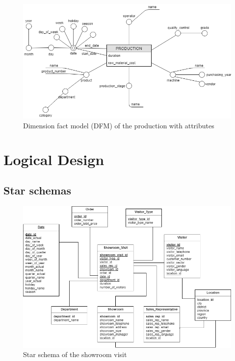 \documentclass[letterpaper,12pt]{article}
\begin{document}
\begin{figure}[h] 
        \centering
        \includegraphics[width=\columnwidth]{../images/DFM_Production.png}
        \caption{
                \label{fig:productionAttributes}  
                Dimension fact model (DFM) of the production with attributes 
        }
\end{figure}

\section{Logical Design}

\subsection{Star schemas}

\begin{figure}[h] 
        \centering
        \includegraphics[width=\columnwidth]{../images/Starschema_Showroom_visit.png}
        \caption{
                \label{fig:starschemaShowroom}  
                Star schema of the showroom visit
        }
\end{figure}
\end{document}
